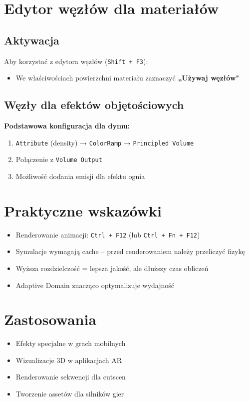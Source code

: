 \section{Edytor węzłów dla materiałów}

\subsection{Aktywacja}
Aby korzystać z edytora węzłów (\texttt{Shift + F3}):
\begin{itemize}[leftmargin=*]
    \item We właściwościach powierzchni materiału zaznaczyć \textbf{„Używaj węzłów"}
\end{itemize}

\subsection{Węzły dla efektów objętościowych}
\textbf{Podstawowa konfiguracja dla dymu:}
\begin{enumerate}
    \item \texttt{Attribute} (density) → \texttt{ColorRamp} → \texttt{Principled Volume}
    \item Połączenie z \texttt{Volume Output}
    \item Możliwość dodania emisji dla efektu ognia
\end{enumerate}

\section{Praktyczne wskazówki}

\begin{itemize}[leftmargin=*]
    \item Renderowanie animacji: \texttt{Ctrl + F12} (lub \texttt{Ctrl + Fn + F12})
    \item Symulacje wymagają cache -- przed renderowaniem należy przeliczyć fizykę
    \item Wyższa rozdzielczość = lepsza jakość, ale dłuższy czas obliczeń
    \item Adaptive Domain znacząco optymalizuje wydajność
\end{itemize}

\section{Zastosowania}
\begin{itemize}[leftmargin=*]
    \item Efekty specjalne w grach mobilnych
    \item Wizualizacje 3D w aplikacjach AR
    \item Renderowanie sekwencji dla cutscen
    \item Tworzenie assetów dla silników gier
\end{itemize}

